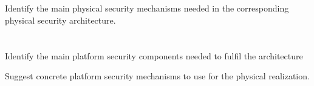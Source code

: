 \begin{questions}
\begin{parts}
  \part{} Identify the main physical security mechanisms needed in the corresponding physical security architecture.
  \part{} Identify the main platform security components needed to fulfil the architecture
    \begin{subparts}
    \subpart{} Suggest concrete platform security mechanisms to use for the physical realization.
    \end{subparts}
  \end{parts}
\end{questions}


